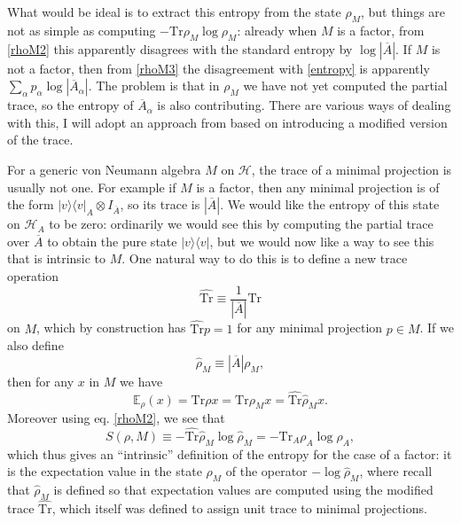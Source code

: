 \documentclass[12pt]{article}
\newcommand{\be}{\begin{equation}}
\newcommand{\ee}{\end{equation}}
\newcommand{\lan}{\langle}
\newcommand{\ran}{\rangle}
\newcommand{\Tr}{\mathrm{Tr}}
\newcommand{\Hh}{\mathcal{H}}
\newcommand{\HA}{\mathcal{H}_A}
\newcommand{\Ab}{\ol{A}}
\newcommand{\ol}{\overline}
\begin{document}
What would be ideal is to extract this entropy from the state $\rho_M$, but things are not as simple as computing $-\Tr \rho_M \log \rho_M$: already when $M$ is a factor, from \eqref{rhoM2} this apparently disagrees with the standard entropy by $\log |\Ab|$.  If $M$ is not a factor, then from \eqref{rhoM3} the disagreement with \eqref{entropy} is apparently $\sum_\alpha p_\alpha \log |\Ab_\alpha|$.  The problem is that in $\rho_M$ we have not yet computed the partial trace, so the entropy of $\Ab_\alpha$ is also contributing.  There are various ways of dealing with this, I will adopt an approach from \cite{ohya2004quantum} based on introducing a modified version of the trace.  

For a generic von Neumann algebra $M$ on $\Hh$, the trace of a minimal projection is usually not one.  For example if $M$ is a factor, then any minimal projection is of the form $|v\ran\lan v|_A \otimes I_{\Ab}$, so its trace is $|\Ab|$.  We would like the entropy of this state on $\HA$ to be zero: ordinarily we would see this by computing the partial trace over $\Ab$ to obtain the pure state $|v\ran\lan v|$, but we would now like a way to see this that is intrinsic to $M$.  One natural way to do this is to define a new trace operation 
\be
\hat{\Tr}\equiv \frac{1}{|\Ab|}\Tr
\ee 
on $M$, which by construction has $\hat{\Tr} p=1$ for any minimal projection $p\in M$.  If we also define 
\be
\hat{\rho}_M\equiv |\Ab|\rho_M,
\ee
then for any $x$ in $M$ we have
\be
\mathbb{E}_\rho(x)=\Tr \rho x=\Tr\rho_M x=\hat{\Tr}\hat{\rho}_M x.
\ee
Moreover using eq. \eqref{rhoM2}, we see that 
\be
S(\rho,M)\equiv -\hat{\Tr}\hat{\rho}_M\log \hat{\rho}_M=-\Tr_A\rho_A\log \rho_A,
\ee
which thus gives an ``intrinsic'' definition of the entropy for the case of a factor: it is the expectation value in the state $\rho_M$ of the operator $-\log\hat{\rho}_M$, where recall that $\hat{\rho}_M$ is defined so that expectation values are computed using the modified trace $\hat{\Tr}$, which itself was defined to assign unit trace to minimal projections.    
\end{document}
